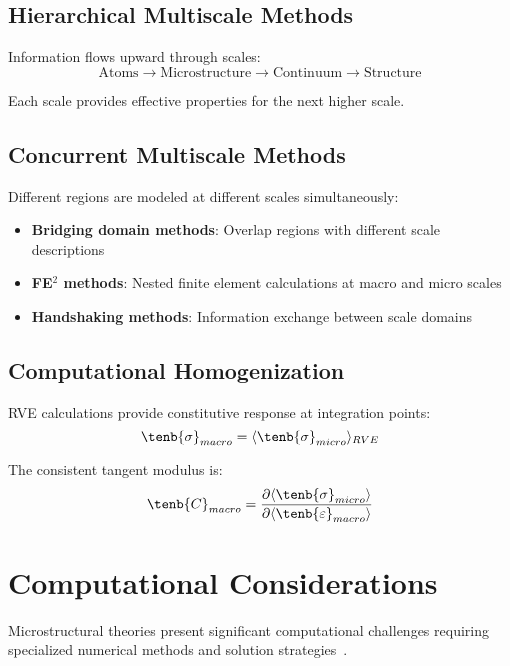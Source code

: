 \subsection{Hierarchical Multiscale Methods}

Information flows upward through scales:
\begin{equation}
\text{Atoms} \rightarrow \text{Microstructure} \rightarrow \text{Continuum} \rightarrow \text{Structure}
\end{equation}

Each scale provides effective properties for the next higher scale.

\subsection{Concurrent Multiscale Methods}

Different regions are modeled at different scales simultaneously:
\begin{itemize}
\item \textbf{Bridging domain methods}: Overlap regions with different scale descriptions
\item \textbf{FE$^2$ methods}: Nested finite element calculations at macro and micro scales
\item \textbf{Handshaking methods}: Information exchange between scale domains
\end{itemize}

\subsection{Computational Homogenization}

RVE calculations provide constitutive response at integration points:
\begin{equation}
\tenb{\sigma}_{macro} = \langle \tenb{\sigma}_{micro} \rangle_{RVE}
\end{equation}

The consistent tangent modulus is:
\begin{equation}
\tenb{C}_{macro} = \frac{\partial \langle \tenb{\sigma}_{micro} \rangle}{\partial \langle \tenb{\varepsilon}_{macro} \rangle}
\end{equation}

\section{Computational Considerations}

Microstructural theories present significant computational challenges requiring specialized numerical methods and solution strategies~\autocite{Sadd.2019}.

